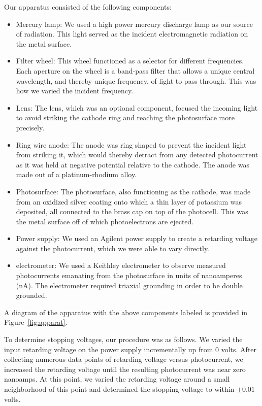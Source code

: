 \documentclass[aps,twocolumn,secnumarabic,balancelastpage,amsmath,amssymb,nofootinbib, floatfix]{revtex4-2}
\begin{document}
Our apparatus consisted of the following components:
\begin{itemize}
	\item Mercury lamp: We used a high power mercury discharge lamp as our source of radiation. This light served as the incident electromagnetic radiation on the metal surface. 
	\item Filter wheel: This wheel functioned as a selector for different frequencies. Each aperture on the wheel is a band-pass filter that allows a unique central wavelength, and thereby unique frequency, of light to pass through. This was how we varied the incident frequency. 
	\item Lens: The lens, which was an optional component, focused the incoming light to avoid striking the cathode ring and reaching the photosurface more precisely. 
	\item Ring wire anode: The anode was ring shaped to prevent the incident light from striking it, which would thereby detract from any detected photocurrent as it was held at negative potential relative to the cathode. The anode was made out of a platinum-rhodium alloy.
	\item Photosurface: The photosurface, also functioning as the cathode, was made from an oxidized silver coating onto which a thin layer of potassium was deposited, all connected to the brass cap on top of the photocell. This was the metal surface off of which photoelectrons are ejected.
	\item Power supply: We used an Agilent power supply to create a retarding voltage against the photocurrent, which we were able to vary directly.
	\item electrometer: We used a Keithley electrometer to observe measured photocurrents emanating from the photosurface in units of nanoamperes (nA). The electrometer required triaxial grounding in order to be double grounded.
\end{itemize}
A diagram of the apparatus with the above components labeled is provided in Figure~\ref{fig:apparat}. 

To determine stopping voltages, our procedure was as follows. We varied the input retarding voltage on the power supply incrementally up from 0 volts. After collecting numerous data points of retarding voltage versus photocurrent, we increased the retarding voltage until the resulting photocurrent was near zero nanoamps. At this point, we varied the retarding voltage around a small neighborhood of this point and determined the stopping voltage to within $\pm0.01$ volts.
\end{document}
